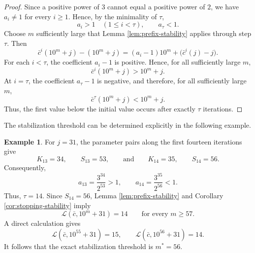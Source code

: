 \documentclass[11pt]{article}
\theoremstyle{plain}
\theoremstyle{definition}
\newtheorem{example}{Example}
\theoremstyle{remark}
\begin{document}
\begin{proof}
Since a positive power of $3$ cannot equal a positive power of $2$, we have $a_i\neq1$ for every $i\ge1$. 
Hence, by the minimality of $\tau$,
\begin{displaymath}
a_i>1\quad(1\le i<\tau), \qquad a_\tau<1.
\end{displaymath}
Choose $m$ sufficiently large that Lemma \ref{lem:prefix-stability} applies through step $\tau$. Then
\begin{displaymath}
\bar c^i(10^m+j)-(10^m+j) = (a_i-1)10^m+\bigl(\bar c^i(j)-j\bigr).
\end{displaymath}
For each $i<\tau$, the coefficient $a_i-1$ is positive. Hence, for
all sufficiently large $m$,
\begin{displaymath}
\bar c^i(10^m+j)>10^m+j.
\end{displaymath}
At $i=\tau$, the coefficient $a_\tau-1$ is negative, and therefore,
for all sufficiently large $m$,
\begin{displaymath}
\bar c^\tau(10^m+j)<10^m+j.
\end{displaymath}
Thus, the first value below the initial value occurs after exactly
$\tau$ iterations.
\end{proof}

The stabilization threshold can be determined explicitly in the following example.
\begin{example}\label{ex:j31}
For $j=31$, the parameter pairs along the first fourteen iterations
give
\begin{displaymath}
K_{13}=34,\qquad S_{13}=53, \qquad\text{and}\qquad K_{14}=35,\qquad S_{14}=56.
\end{displaymath}
Consequently,
\begin{displaymath}
a_{13}=\frac{3^{34}}{2^{53}}>1,\qquad a_{14}=\frac{3^{35}}{2^{56}}<1.
\end{displaymath}
Thus, $\tau=14$. Since $S_{14}=56$, Lemma \ref{lem:prefix-stability} and Corollary \ref{cor:stopping-stability} imply
\begin{displaymath}
\mathcal{L}(\bar c,10^m+31)=14 \qquad\text{for every }m\ge 57.
\end{displaymath}
A direct calculation gives
\begin{displaymath}
\mathcal{L}(\bar c,10^{55}+31)=15, \qquad \mathcal{L}(\bar c,10^{56}+31)=14.
\end{displaymath}
It follows that the exact stabilization threshold is $m^*=56.$
\end{example}
\end{document}
